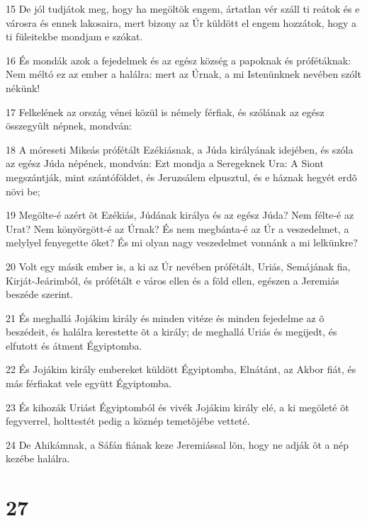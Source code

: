 \par 15 De jól tudjátok meg, hogy ha megöltök engem, ártatlan vér száll ti reátok és e városra és ennek lakosaira, mert bizony az Úr küldött el engem hozzátok, hogy a ti füleitekbe mondjam e szókat.
\par 16 És mondák azok a fejedelmek és az egész község a papoknak és prófétáknak: Nem méltó ez az ember a halálra: mert az Úrnak, a mi Istenünknek nevében szólt nékünk!
\par 17 Felkelének az ország vénei közül is némely férfiak, és szólának az egész összegyûlt népnek, mondván:
\par 18 A móreseti Mikeás prófétált Ezékiásnak, a Júda királyának idejében, és szóla az egész Júda népének, mondván: Ezt mondja a Seregeknek Ura: A Siont megszántják, mint szántóföldet, és Jeruzsálem elpusztul, és e háznak hegyét erdõ növi be;
\par 19 Megölte-é azért õt Ezékiás, Júdának királya és az egész Júda? Nem félte-é az Urat? Nem könyörgött-é az Úrnak? És nem megbánta-é az Úr a veszedelmet, a melylyel fenyegette õket? És mi olyan nagy veszedelmet vonnánk a mi lelkünkre?
\par 20 Volt egy másik ember is, a ki az Úr nevében prófétált, Uriás, Semájának fia, Kirját-Jeárimból, és prófétált e város ellen és a föld ellen, egészen a Jeremiás beszéde szerint.
\par 21 És meghallá Jojákim király és minden vitéze és minden fejedelme az õ beszédeit, és halálra kerestette õt a király; de meghallá Uriás és megijedt, és elfutott és átment Égyiptomba.
\par 22 És Jojákim király embereket küldött Égyiptomba, Elnátánt, az Akbor fiát, és más férfiakat vele együtt Égyiptomba.
\par 23 És kihozák Uriást Égyiptomból és vivék Jojákim király elé, a ki megöleté õt fegyverrel, holttestét pedig a köznép temetõjébe vetteté.
\par 24 De Ahikámnak, a Sáfán fiának keze Jeremiással lõn, hogy ne adják õt a nép kezébe  halálra.

\chapter{27}

